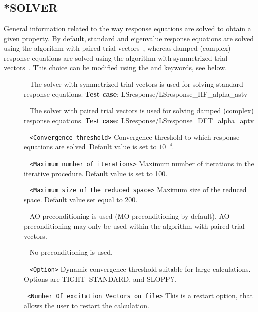 \subsection{*SOLVER}\label{subsec:responsesolver}
General information related to the way response equations are solved to 
obtain a given property.
By default, standard and eigenvalue response equations are solved using the
algorithm with paired trial vectors~\cite{coriani:2007}, whereas damped
(complex) response equations are solved using the algorithm with
symmetrized trial vectors~\cite{kauczor:2011}.\newline
This choice can be modified using the  and  keywords, see below.
\begin{description}
\item[] \verb| | \newline
The solver with symmetrized trial vectors is used for solving standard
response equations.\newline
{\bf Test case}: LSresponse/LSresponse\_HF\_alpha\_astv
\item[] \verb| | \newline
The solver with paired trial vectors is used for solving damped (complex)
response equations.\newline
{\bf Test case}: LSresponse/LSresponse\_DFT\_alpha\_aptv
\item[] \verb| | \newline
\verb|<Convergence threshold>|\newline
Convergence threshold to which response equations are solved.
Default value is set to $10^{-4}$.
\item[] \verb| | \newline
\verb|<Maximum number of iterations>|\newline
Maximum number of iterations in the iterative procedure.
Default value is set to 100.
\item[] \verb| | \newline
\verb|<Maximum size of the reduced space>|\newline
Maximum size of the reduced space.
Default value set equal to 200.
\item[] \verb| | \newline
AO preconditioning is used (MO preconditioning by default).
AO preconditioning may only be used within the algorithm with paired trial vectors.
\item[] \verb| | \newline
No preconditioning is used.
\item[] \verb| | \newline
\verb|<Option>|\newline 
Dynamic convergence threshold suitable for large calculations.
Options are TIGHT, STANDARD, and SLOPPY.
\item[] \verb| | \newline
\verb|<Number Of excitation Vectors on file>|\newline 
This is a restart option, that allows the user to restart the calculation. 


\end{description}
